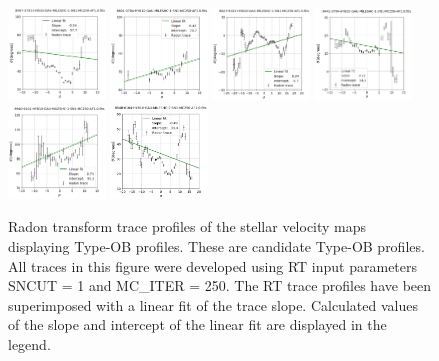 \documentclass[fleqn,usenatbib]{mnras}
\begin{document}
\begin{figure}
    \centering
    \includegraphics[width=0.23\textwidth]{Images/LINFITS/CPSB-8997-3703-LINFIT-EBARS-MASKED.png}
    \includegraphics[width=0.23\textwidth]{Images/LINFITS/CC1-8601-3704-LINFIT-EBARS-MASKED.png}
    \includegraphics[width=0.23\textwidth]{Images/LINFITS/CPSB-8623-9102-LINFIT-EBARS-MASKED.png}
    \includegraphics[width=0.23\textwidth]{Images/LINFITS/CC0-8442-3704-LINFIT-EBARS-MASKED.png}
    \includegraphics[width=0.23\textwidth]{Images/LINFITS/CC0-8940-6101-LINFIT-EBARS-MASKED.png}
    \includegraphics[width=0.23\textwidth]{Images/LINFITS/CC1-8548-6104-LINFIT-EBARS-MASKED.png}
    \caption{Radon transform trace profiles of the stellar velocity maps displaying Type-OB profiles. These are candidate Type-OB profiles. 
    All traces in this figure were developed using RT input parameters SNCUT = 1 and MC\_ITER = 250. The RT trace profiles have been superimposed with a linear fit of the trace slope. Calculated values of the slope and intercept of the linear fit are displayed in the legend.}
    \label{fig:Radon-traces-Candidate-TYPE-OB-LINFITS}
\end{figure}
\end{document}
